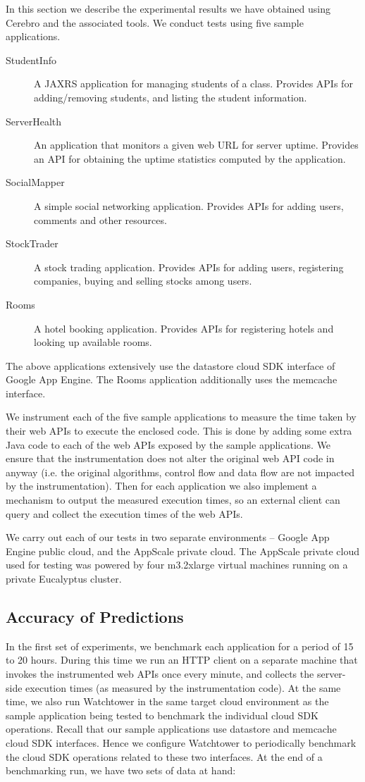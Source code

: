 In this section we describe the experimental results we have obtained using Cerebro and the associated tools. We conduct
tests using five sample applications. 

\begin{description}
\item[StudentInfo] A JAXRS application for managing students of a class. Provides APIs for
adding/removing students, and listing the student information.
\item[ServerHealth] An application that monitors a given web URL for server uptime. Provides an
API for obtaining the uptime statistics computed by the application.
\item[SocialMapper] A simple social networking application. Provides APIs for adding users,
comments and other resources.
\item[StockTrader] A stock trading application. Provides APIs for adding users, registering
companies, buying and selling stocks among users.
\item[Rooms] A hotel booking application. Provides APIs for registering hotels and looking up
available rooms.
\end{description}

The above applications extensively use the datastore cloud SDK interface of Google App Engine. The Rooms application
additionally uses the memcache interface.

We instrument each of the five sample applications to measure the time taken by their web APIs to execute the
enclosed code. This is done by adding some extra Java code to each of the web APIs exposed by the sample applications.
We ensure that the instrumentation does not alter the original web API code in anyway (i.e. the original algorithms, control flow
and data flow are not impacted by the instrumentation). Then for each application we also
implement a mechanism to output the measured execution times, so an external client can query and collect the execution
times of the web APIs.

We carry out each of our tests in two separate environments -- Google App Engine public cloud, and
the AppScale private cloud. The AppScale private cloud used for testing was powered by four m3.2xlarge virtual machines 
running on a private Eucalyptus cluster.

\subsection{Accuracy of Predictions}
In the first set of experiments, we benchmark each application for a period of 15 to 20 hours.
During this time we run an HTTP client on a separate machine that invokes the instrumented web APIs once every minute, 
and collects the server-side execution times (as measured by the instrumentation code).
At the same time, we also run Watchtower in the same target cloud environment as the sample application being tested to
benchmark the individual cloud SDK operations. Recall that our sample applications use datastore and memcache
cloud SDK interfaces. Hence
we configure Watchtower to periodically benchmark the cloud SDK operations related to these two interfaces. 
At the end of a benchmarking run, we have two sets of data at hand:

